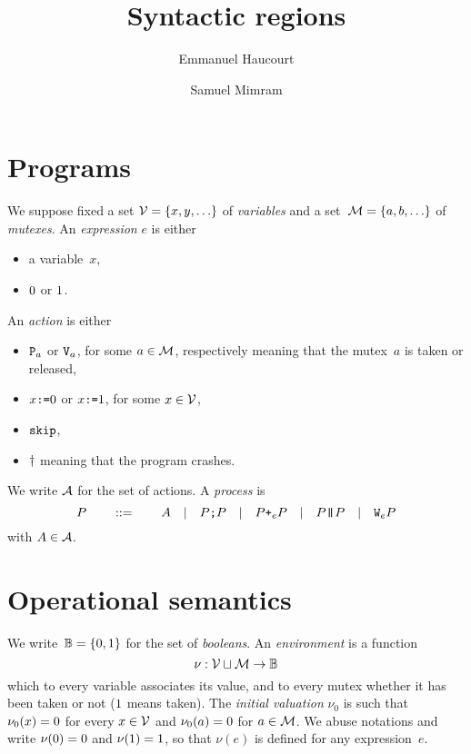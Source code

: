\documentclass[a4paper]{article}
\title{Syntactic regions}
\author{Emmanuel Haucourt \and Samuel Mimram}
\theoremstyle{theorem}
\theoremstyle{remark}
\begin{document}
\maketitle

\section{Programs}
We suppose fixed a set $\variables=\set{x,y,\ldots}$ of \emph{variables} and a
set~$\mutexes=\set{a,b,\ldots}$ of \emph{mutexes}. An \emph{expression} $e$ is either
\begin{itemize}
\item a variable~$x$,
\item $\Bfalse$ or $\Btrue$.
\end{itemize}
An \emph{action} is either
\begin{itemize}
\item $\P a$ or $\V a$, for some $a\in\mutexes$, respectively meaning that the
  mutex~$a$ is taken or released,
\item $\pset x\Bfalse$ or $\pset x\Btrue$, for some $x\in\variables$,
\item $\pskip$,
\item $\pdie$ meaning that the program crashes.
\end{itemize}
We write $\actions$ for the set of actions. A \emph{process} is
\[
  P
  \qquad::=\qquad
  A
  \quad|\quad
  \pseq PP
  \quad|\quad
  \por ePP
  \quad|\quad
  \ppar PP
  \quad|\quad
  \ploop eP
\]
with $A\in\actions$.

\section{Operational semantics}
We write~$\B=\set{\Bfalse,\Btrue}$ for the set of \emph{booleans}. An
\emph{environment} is a function
\[
  \nu:\variables\sqcup\mutexes\to\B
\]
which to every variable associates its value, and to every mutex whether it has
been taken or not ($\Btrue$ means taken). The \emph{initial valuation} $\nu_0$
is such that $\nu_0(x)=\Bfalse$ for every $x\in\variables$ and
$\nu_0(a)=\Bfalse$ for $a\in\mutexes$. We abuse notations and write
$\nu(\Bfalse)=\Bfalse$ and $\nu(\Btrue)=\Btrue$, so that $\nu(e)$ is defined for
any expression~$e$.
\end{document}
